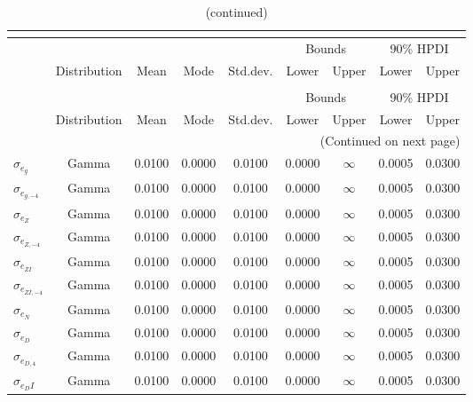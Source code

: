  
\begin{center}
\begin{longtable}{lcccccccc} 
\caption{Prior information (parameters)}\\
 \label{Table:Prior}\\
\toprule%
  &  &  &  &  & \multicolumn{2}{c}{Bounds} & \multicolumn{2}{c}{90\% HPDI} \\ 
  \cmidrule(r{.75em}){6-7} \cmidrule(r{.75em}){8-9}
  & Distribution & Mean & Mode & Std.dev. & Lower & Upper & Lower & Upper  \\ 
\midrule
\endfirsthead
\caption{(continued)}\\
 \toprule%
  &  &  &  &  & \multicolumn{2}{c}{Bounds} & \multicolumn{2}{c}{90\% HPDI} \\ 
  \cmidrule(r{.75em}){6-7} \cmidrule(r{.75em}){8-9}
  & Distribution & Mean & Mode & Std.dev. & Lower & Upper & Lower & Upper  \\ 
\midrule
\endhead
\midrule
\multicolumn{9}{r}{(Continued on next page)} \\ 
\bottomrule
\endfoot
\bottomrule
\endlastfoot
$ \sigma_{{e_g}} $ & Gamma & 0.0100 & 0.0000 & 0.0100 & 0.0000 & $\infty$ & 0.0005 & 0.0300 \\ 
$ \sigma_{{e_{g,-4}}} $ & Gamma & 0.0100 & 0.0000 & 0.0100 & 0.0000 & $\infty$ & 0.0005 & 0.0300 \\ 
$ \sigma_{{e_Z}} $ & Gamma & 0.0100 & 0.0000 & 0.0100 & 0.0000 & $\infty$ & 0.0005 & 0.0300 \\ 
$ \sigma_{{e_{Z,-4}}} $ & Gamma & 0.0100 & 0.0000 & 0.0100 & 0.0000 & $\infty$ & 0.0005 & 0.0300 \\ 
$ \sigma_{{e_{ZI}}} $ & Gamma & 0.0100 & 0.0000 & 0.0100 & 0.0000 & $\infty$ & 0.0005 & 0.0300 \\ 
$ \sigma_{{e_{ZI,-4}}} $ & Gamma & 0.0100 & 0.0000 & 0.0100 & 0.0000 & $\infty$ & 0.0005 & 0.0300 \\ 
$ \sigma_{{e_N}} $ & Gamma & 0.0100 & 0.0000 & 0.0100 & 0.0000 & $\infty$ & 0.0005 & 0.0300 \\ 
$ \sigma_{{e_D}} $ & Gamma & 0.0100 & 0.0000 & 0.0100 & 0.0000 & $\infty$ & 0.0005 & 0.0300 \\ 
$ \sigma_{{e_{D,4}}} $ & Gamma & 0.0100 & 0.0000 & 0.0100 & 0.0000 & $\infty$ & 0.0005 & 0.0300 \\ 
$ \sigma_{{e_DI}} $ & Gamma & 0.0100 & 0.0000 & 0.0100 & 0.0000 & $\infty$ & 0.0005 & 0.0300 \\ 

\end{longtable}
\end{center}
